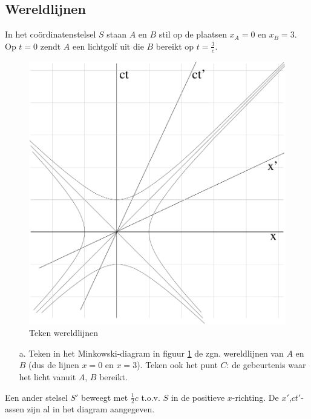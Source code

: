 \subsection{Wereldlijnen}
In  het  co\"{o}rdinatenstelsel $S$ staan $A$ en $B$ stil op de plaatsen
$x_{A} = 0$ en $x_{B} = 3$. 
Op $t = 0$ zendt $A$ 
een lichtgolf uit die $B$ bereikt op $t = \frac{3}{c}$. 



\begin{figure}[ht]
\centering
\includegraphics[width=.8\textwidth]{oefeningen.pictures/oef_4/kleurplaat}
\caption{Teken wereldlijnen}
\label{f:kleurplaat}
\end{figure}

\begin{itemize}
\item [a.]
  Teken in het Minkowski-diagram in figuur \ref{f:kleurplaat}
  de zgn. wereldlijnen van $A$ en $B$ 
(dus de lijnen $x = 0$ 
  en $x = 3$). Teken ook het punt $C$: de gebeurtenis waar het licht vanuit $A$, $B$ bereikt. 
\end{itemize}
Een  ander stelsel $S'$ beweegt met $\frac{1}{2}c$ t.o.v. $S$ in de positieve 
$x$-richting.
De $x'$,$ct'$-assen zijn 
al in het diagram aangegeven. 

